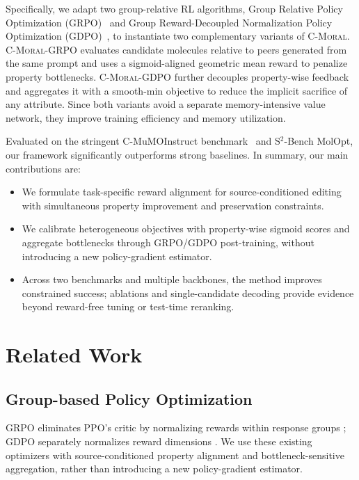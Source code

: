 \documentclass[11pt]{article}
\begin{document}
Specifically, we adapt two group-relative RL algorithms, Group Relative Policy Optimization (GRPO)~\cite{shao2024deepseekmathpushinglimitsmathematical} and Group Reward-Decoupled Normalization Policy Optimization (GDPO)~\cite{liu2026gdpogrouprewarddecouplednormalization}, to instantiate two complementary variants of \textsc{C-Moral}. \textsc{C-Moral}-GRPO evaluates candidate molecules relative to peers generated from the same prompt and uses a sigmoid-aligned geometric mean reward to penalize property bottlenecks. \textsc{C-Moral}-GDPO further decouples property-wise feedback and aggregates it with a smooth-min objective to reduce the implicit sacrifice of any attribute. Since both variants avoid a separate memory-intensive value network, they improve training efficiency and memory utilization.

Evaluated on the stringent C-MuMOInstruct benchmark~\cite{dey2025large} and S$^2$-Bench MolOpt, our framework significantly outperforms strong baselines. In summary, our main contributions are:
\begin{itemize}
    \setlength{\itemsep}{0pt}
    \setlength{\parskip}{0pt}
    \setlength{\parsep}{0pt}
    \item We formulate task-specific reward alignment for source-conditioned editing with simultaneous property improvement and preservation constraints.
    \item We calibrate heterogeneous objectives with property-wise sigmoid scores and aggregate bottlenecks through GRPO/GDPO post-training, without introducing a new policy-gradient estimator.
    \item Across two benchmarks and multiple backbones, the method improves constrained success; ablations and single-candidate decoding provide evidence beyond reward-free tuning or test-time reranking.
\end{itemize}






\section{Related Work}
\label{sec:related-work}

\subsection{Group-based Policy Optimization}

GRPO eliminates PPO's critic by normalizing rewards within response groups \cite{shao2024deepseekmathpushinglimitsmathematical}; GDPO separately normalizes reward dimensions \cite{liu2026gdpogrouprewarddecouplednormalization}. We use these existing optimizers with source-conditioned property alignment and bottleneck-sensitive aggregation, rather than introducing a new policy-gradient estimator.
\end{document}
